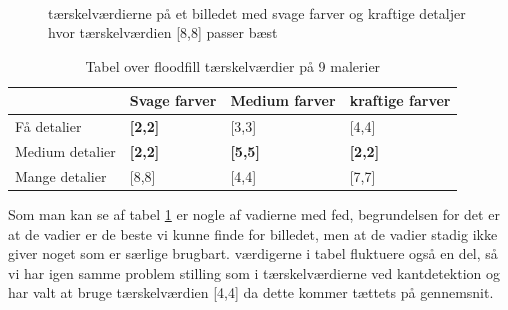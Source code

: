 \begin{figure}[!h]
    \centering
    \\
    \caption[]{tærskelværdierne på et billedet med svage farver og kraftige detaljer hvor tærskelværdien [8,8] passer bæst}
    \label{Floodfillbilledet}
\end{figure}

\begin{table}[!h]
    \centering
    \begin{tabular}{| l | l | l | l |} \hline
        & Svage farver 		& Medium farver & kraftige farver \\ \hline
        Få detalier 		& \textbf{[2,2]}	& [3,3]			& [4,4]\\ \hline
        Medium detalier 	& \textbf{[2,2]}	& \textbf{[5,5]}& \textbf{[2,2]}\\ \hline
        Mange detalier		& [8,8]				& [4,4]			& [7,7]\\ \hline
    \end{tabular}
    \caption{Tabel over floodfill tærskelværdier på 9 malerier}
    \label{thressholdsTabelFF}
\end{table}

Som man kan se af tabel \ref{thressholdsTabelFF} er nogle af vadierne med fed, begrundelsen for det er
at de vadier er de beste vi kunne finde for billedet, men at de vadier stadig
ikke giver noget som er særlige brugbart.
værdigerne i tabel fluktuere også en del, så vi har igen samme problem stilling
som i tærskelværdierne ved kantdetektion og har valt at bruge tærskelværdien
[4,4] da dette kommer tættets på gennemsnit.

